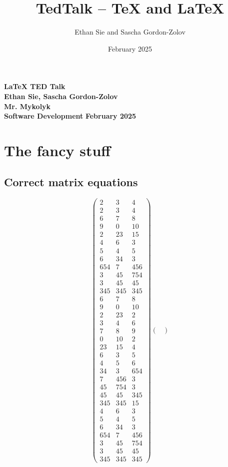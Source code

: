 \documentclass{article}%
\title{TedTalk – TeX and LaTeX}
\author{Ethan Sie and Sascha Gordon-Zolov}
\date{February 2025}
\begin{document}
%
\normalsize%

    \noindent \textbf{\LARGE {LaTeX TED Talk}} \\
    \noindent \textbf{Ethan Sie, Sascha Gordon-Zolov \\ Mr. Mykolyk \\ Software Development} \hfill \textbf{February 2025}
\section{The fancy stuff}%
\label{sec:Thefancystuff}%
\subsection{Correct matrix equations}%
\label{subsec:Correctmatrixequations}%
\[%
\begin{pmatrix}%
2&3&4\\%
2&3&4\\%
6&7&8\\%
9&0&10\\%
2&23&15\\%
4&6&3\\%
5&4&5\\%
6&34&3\\%
654&7&456\\%
3&45&754\\%
3&45&45\\%
345&345&345\\%
6&7&8\\%
9&0&10\\%
2&23&2\\%
3&4&6\\%
7&8&9\\%
0&10&2\\%
23&15&4\\%
6&3&5\\%
4&5&6\\%
34&3&654\\%
7&456&3\\%
45&754&3\\%
45&45&345\\%
345&345&15\\%
4&6&3\\%
5&4&5\\%
6&34&3\\%
654&7&456\\%
3&45&754\\%
3&45&45\\%
345&345&345%
\end{pmatrix} \begin{pmatrix}%

\end{pmatrix}\]
\end{document}
